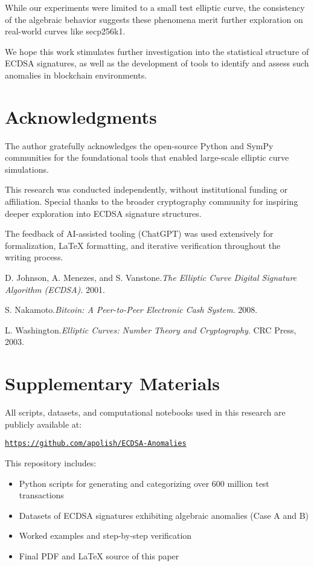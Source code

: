 \documentclass[11pt]{article}
\begin{document}
While our experiments were limited to a small test elliptic curve, the consistency of the algebraic behavior suggests these phenomena merit further exploration on real-world curves like secp256k1.

We hope this work stimulates further investigation into the statistical structure of ECDSA signatures, as well as the development of tools to identify and assess such anomalies in blockchain environments.

\section*{Acknowledgments}
The author gratefully acknowledges the open-source Python and SymPy communities for the foundational tools that enabled large-scale elliptic curve simulations.

This research was conducted independently, without institutional funding or affiliation. Special thanks to the broader cryptography community for inspiring deeper exploration into ECDSA signature structures.

The feedback of AI-assisted tooling (ChatGPT) was used extensively for formalization, LaTeX formatting, and iterative verification throughout the writing process.

\begin{thebibliography}{9}
D. Johnson, A. Menezes, and S. Vanstone.\textit{The Elliptic Curve Digital Signature Algorithm (ECDSA)}. 2001.

S. Nakamoto.\textit{Bitcoin: A Peer-to-Peer Electronic Cash System}. 2008.

L. Washington.\textit{Elliptic Curves: Number Theory and Cryptography}. CRC Press, 2003.
\end{thebibliography}

\section*{Supplementary Materials}

All scripts, datasets, and computational notebooks used in this research are publicly available at:

\texttt{\url{https://github.com/apolish/ECDSA-Anomalies}}

This repository includes:
\begin{itemize}
  \item Python scripts for generating and categorizing over 600 million test transactions
  \item Datasets of ECDSA signatures exhibiting algebraic anomalies (Case A and B)
  \item Worked examples and step-by-step verification
  \item Final PDF and LaTeX source of this paper
\end{itemize}
\end{document}
